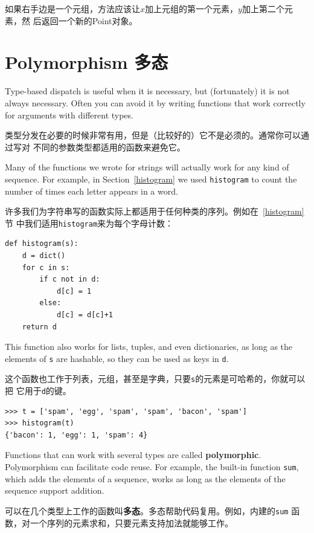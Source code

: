 \documentclass[10pt]{book}
\begin{document}
\begin{CJK}{UTF8}{gbsn}
\begin{exercise}
\begin{itemize}
如果右手边是一个元组，方法应该让$x$加上元组的第一个元素，$y$加上第二个元素，然
后返回一个新的Point对象。

\end{itemize}

\end{exercise}

\section{Polymorphism 多态}

Type-based dispatch is useful when it is necessary, but (fortunately)
it is not always necessary.  Often you can avoid it by writing functions
that work correctly for arguments with different types.

类型分发在必要的时候非常有用，但是（比较好的）它不是必须的。通常你可以通过写对
不同的参数类型都适用的函数来避免它。

Many of the functions we wrote for strings will actually
work for any kind of sequence.
For example, in Section~\ref{histogram}
we used {\tt histogram} to count the number of times each letter
appears in a word.

许多我们为字符串写的函数实际上都适用于任何种类的序列。例如在~\ref{histogram}节
中我们适用{\tt histogram}来为每个字母计数：

\begin{verbatim}
def histogram(s):
    d = dict()
    for c in s:
        if c not in d:
            d[c] = 1
        else:
            d[c] = d[c]+1
    return d
\end{verbatim}
%
This function also works for lists, tuples, and even dictionaries,
as long as the elements of {\tt s} are hashable, so they can be used
as keys in {\tt d}.

这个函数也工作于列表，元组，甚至是字典，只要{\tt s}的元素是可哈希的，你就可以把
它用于{\tt d}的键。

\begin{verbatim}
>>> t = ['spam', 'egg', 'spam', 'spam', 'bacon', 'spam']
>>> histogram(t)
{'bacon': 1, 'egg': 1, 'spam': 4}
\end{verbatim}
%
Functions that can work with several types are called {\bf polymorphic}.
Polymorphism can facilitate code reuse.  For example, the built-in
function {\tt sum}, which adds the elements of a sequence, works
as long as the elements of the sequence support addition.

可以在几个类型上工作的函数叫{\bf 多态}。多态帮助代码复用。例如，内建的{\tt sum}
函数，对一个序列的元素求和，只要元素支持加法就能够工作。


\end{CJK}
\end{document}
